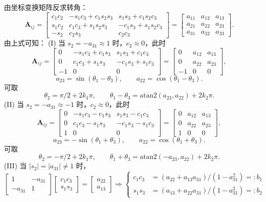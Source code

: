 由坐标变换矩阵反求转角：
\[
\boldsymbol{A}_{ij}=
\begin{bmatrix}
c_1c_2 & -s_1c_3+c_1s_2s_3 & s_1s_3+c_1s_2c_3\\
s_1c_2 & c_1c_3+s_1s_2s_3 & -c_1s_3+s_1s_2c_3\\
-s_2 & c_2s_3 & c_2c_3
\end{bmatrix}
=
\begin{bmatrix}
a_{11} & a_{12} & a_{13}\\
a_{21} & a_{22} & a_{23}\\
a_{31} & a_{32} & a_{33}
\end{bmatrix}.
\]
由上式可知：
(I) 当 $s_2=-a_{31}\approx 1$ 时，$c_2\approx 0$，此时
\[
\boldsymbol{A}_{ij}=
\begin{bmatrix}
0 & -s_1c_3+c_1s_3 & s_1s_3+c_1c_3\\
0 & c_1c_3+s_1s_3 & -c_1s_3+s_1c_3\\
-1 & 0 & 0
\end{bmatrix}
=
\begin{bmatrix}
0 & a_{12} & a_{13}\\
0 & a_{22} & a_{23}\\
-1 & 0 & 0
\end{bmatrix},
\]
\[
a_{23}=\sin(\theta_1-\theta_3),\qquad a_{22}=\cos(\theta_1-\theta_3).
\]
可取
\[
\theta_2=\pi/2+2k_1\pi,\qquad \theta_1-\theta_3=\mathrm{atan2}(a_{23},a_{22})+2k_2\pi.
\]
(II) 当 $s_2=-a_{31}\approx -1$ 时，$c_2\approx 0$，此时
\[
\boldsymbol{A}_{ij}=
\begin{bmatrix}
0 & -s_1c_3-c_1s_3 & s_1s_3-c_1c_3\\
0 & c_1c_3-s_1s_3 & -c_1s_3-s_1c_3\\
1 & 0 & 0
\end{bmatrix}
=
\begin{bmatrix}
0 & a_{12} & a_{13}\\
0 & a_{22} & a_{23}\\
1 & 0 & 0
\end{bmatrix},
\]
\[
a_{23}=-\sin(\theta_1+\theta_3),\qquad a_{22}=\cos(\theta_1+\theta_3).
\]
可取
\[
\theta_2=-\pi/2+2k_1\pi,\qquad \theta_1+\theta_3=\mathrm{atan2}(-a_{23},a_{22})+2k_2\pi.
\]
(III) 当 $|s_2|=|a_{31}|\neq 1$ 时，
\[
\begin{bmatrix}
1 & -a_{31}\\
-a_{31} & 1
\end{bmatrix}
\begin{bmatrix}
c_1c_3\\
s_1s_3
\end{bmatrix}
=
\begin{bmatrix}
a_{22}\\
a_{13}
\end{bmatrix}
\Rightarrow
\left\{\begin{aligned}
c_1c_3 &= (a_{22}+a_{13}a_{31})/(1-a_{31}^2)=:b_1\\
s_1s_3 &= (a_{13}+a_{22}a_{31})/(1-a_{31}^2)=:b_2
\end{aligned}\right.
\]

